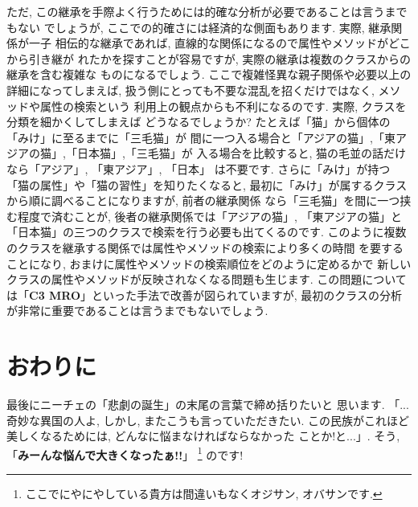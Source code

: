 \documentclass[b5j,8pt,twocolumn]{ltjsarticle}
\begin{document}
ただ, この継承を手際よく行うためには的確な分析が必要であることは言うまでもない
でしょうが, ここでの的確さには経済的な側面もあります. 実際, 継承関係が一子
相伝的な継承であれば, 直線的な関係になるので属性やメソッドがどこから引き継が
れたかを探すことが容易ですが, 実際の継承は複数のクラスからの継承を含む複雑な
ものになるでしょう. ここで複雑怪異な親子関係や必要以上の詳細になってしまえば,
 扱う側にとっても不要な混乱を招くだけではなく, メソッドや属性の検索という
利用上の観点からも不利になるのです. 実際, クラスを分類を細かくしてしまえば
どうなるでしょうか?  たとえば「猫」から個体の「みけ」に至るまでに「三毛猫」が
間に一つ入る場合と「アジアの猫」,「東アジアの猫」,「日本猫」,「三毛猫」が
入る場合を比較すると, 猫の毛並の話だけなら「アジア」, 「東アジア」, 「日本」
は不要です. さらに「みけ」が持つ「猫の属性」や「猫の習性」を知りたくなると,
 最初に「みけ」が属するクラスから順に調べることになりますが, 前者の継承関係
なら「三毛猫」を間に一つ挟む程度で済むことが, 後者の継承関係では「アジアの猫」,
 「東アジアの猫」と「日本猫」の三つのクラスで検索を行う必要も出てくるのです.
 このように複数のクラスを継承する関係では属性やメソッドの検索により多くの時間
を要することになり, おまけに属性やメソッドの検索順位をどのように定めるかで
新しいクラスの属性やメソッドが反映されなくなる問題も生じます. この問題について
は「\textbf{C3 MRO}」といった手法で改善が図られていますが, 最初のクラスの分析
が非常に重要であることは言うまでもないでしょう.

\section{おわりに}

最後にニーチェの「悲劇の誕生」\cite{悲劇の誕生}の末尾の言葉で締め括りたいと
思います. 「...奇妙な異国の人よ, しかし, またこうも言っていただきたい.
 この民族がこれほど美しくなるためには, どんなに悩まなければならなかった
ことか!と...」. そう, 「\textbf{みーんな悩んで大きくなったぁ!!}」\cite{野坂}
\footnote{ここでにやにやしている貴方は間違いもなくオジサン, オバサンです.}
のです!
\end{document}
